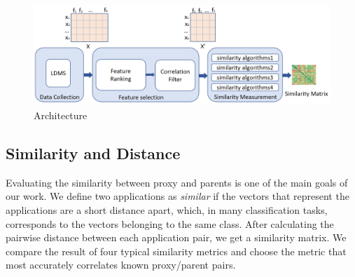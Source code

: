 \begin{figure}[ht]
\centering
\includegraphics[width=\linewidth]{figs/SimEngine.png}
\caption{\us Architecture }
\label{figs:us}
\end{figure}

\subsection{Similarity and Distance}
\label{sec:Sim}

Evaluating the similarity between proxy and parents is one of the main goals of our work. We define two applications as \emph{similar} if the vectors that represent the applications are a short distance apart, which, in many classification tasks, corresponds to the vectors belonging to the same class. %
After calculating the pairwise distance between each application pair, we get a similarity matrix. %
We compare the result of four typical similarity metrics and choose the metric that most accurately correlates known proxy/parent pairs.

